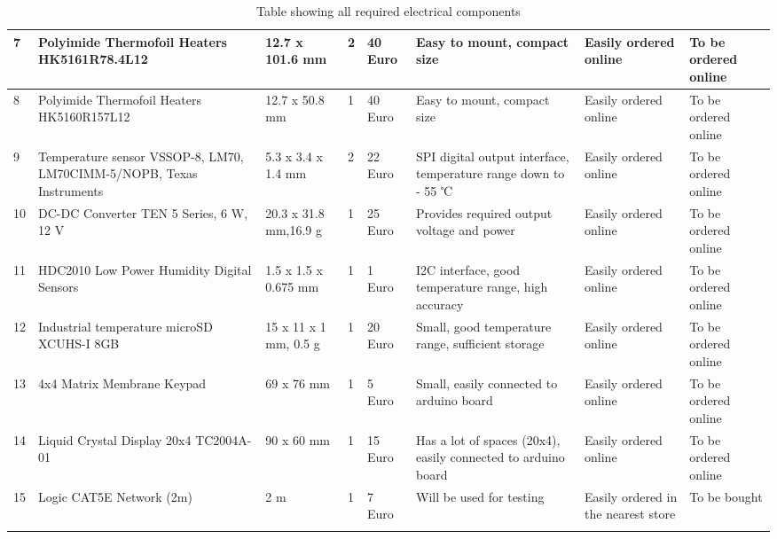 \documentclass[a4paper,12pt,twoside]{article}
\begin{document}
\begin{landscape}
\begin{longtable}{|m{}|m{}|m{}|m{}|m{}|m{}|m{}|m{}|}
7 & Polyimide Thermofoil Heaters HK5161R78.4L12 & 12.7 x 101.6 mm & 2 & 40 Euro & Easy to mount, compact size & Easily ordered online & To be ordered online \\ \hline
8 & Polyimide Thermofoil Heaters HK5160R157L12 & 12.7 x 50.8 mm & 1 & 40 Euro & Easy to mount, compact size & Easily ordered online & To be ordered online \\ \hline
9 & Temperature sensor VSSOP-8, LM70, LM70CIMM-5/NOPB, Texas Instruments & 5.3 x 3.4 x 1.4 mm & 2 & 22 Euro & SPI digital output interface, temperature range down to - 55 ℃ & Easily ordered online & To be ordered online \\ \hline
10 & DC-DC Converter TEN 5 Series, 6 W, 12 V & 20.3 x 31.8 mm,16.9 g & 1 & 25 Euro & Provides required output voltage and power & Easily ordered online & To be ordered online \\ \hline
11 & HDC2010 Low Power Humidity Digital Sensors & 1.5 x 1.5 x 0.675 mm & 1 & 1 Euro & I2C interface, good temperature range, high accuracy & Easily ordered online & To be ordered online \\ \hline
12 & Industrial temperature microSD XCUHS-I 8GB & 15 x 11 x 1 mm, 0.5 g & 1 & 20 Euro & Small, good temperature range, sufficient storage & Easily ordered online & To be ordered online \\ \hline
13 & 4x4 Matrix Membrane Keypad & 69 x 76 mm & 1 & 5 Euro & Small, easily connected to arduino board & Easily ordered online & To be ordered online \\ \hline
14 & Liquid Crystal Display 20x4 TC2004A-01 & 90 x 60 mm & 1 & 15 Euro & Has a lot of spaces (20x4), easily connected to arduino board & Easily ordered online & To be ordered online \\ \hline
15 & Logic CAT5E Network (2m) & 2 m & 1 & 7 Euro & Will be used for testing & Easily ordered in the nearest store & To be bought \\ \hline


    \caption{Table showing all required electrical components}
    \label{tab:electrical-components}
\end{longtable}
\raggedbottom

\end{landscape}
\end{document}
